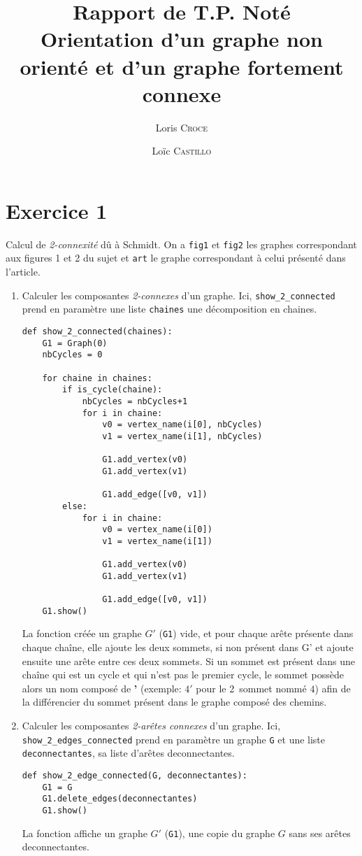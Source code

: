 \documentclass[11pt, a4paper]{article}
\author{Loris \textsc{Croce}\and Loïc \textsc{Castillo}}
\title{
	Rapport de T.P. Noté\\
	Orientation d'un graphe non orienté et d'un graphe fortement connexe
}
\date{}
\begin{document}
\maketitle

\section*{Exercice 1}
Calcul de \emph{2-connexité} dû à Schmidt. On a \verb|fig1| et \verb|fig2| les graphes correspondant aux figures 1 et 2 du sujet et \verb|art| le graphe correspondant à celui présenté dans l'article.
\begin{enumerate}
\item Calculer les composantes \emph{2-connexes} d'un graphe. Ici, \verb|show_2_connected| prend en paramètre une liste \verb|chaines| une décomposition en chaines.

	\begin{verbatim}
def show_2_connected(chaines):
    G1 = Graph(0)
    nbCycles = 0

    for chaine in chaines:
        if is_cycle(chaine):
            nbCycles = nbCycles+1
            for i in chaine:
                v0 = vertex_name(i[0], nbCycles)
                v1 = vertex_name(i[1], nbCycles)

                G1.add_vertex(v0)
                G1.add_vertex(v1)

                G1.add_edge([v0, v1])
        else:
            for i in chaine:
                v0 = vertex_name(i[0])
                v1 = vertex_name(i[1])

                G1.add_vertex(v0)
                G1.add_vertex(v1)

                G1.add_edge([v0, v1])
    G1.show()
    \end{verbatim}

    La fonction créée un graphe $G'$ (\verb|G1|) vide, et pour chaque arête présente dans chaque chaîne, elle ajoute les deux sommets, si non présent dans G' et ajoute ensuite une arête entre ces deux sommets.
    Si un sommet est présent dans une chaîne qui est un cycle et qui n'est pas le premier cycle, le sommet possède alors un nom composé de \textbf{'} (exemple: $4'$ pour le 2\ieme\ sommet nommé $4$) afin de la différencier du sommet présent dans le graphe composé des chemins.

\item Calculer les composantes \emph{2-arêtes connexes} d'un graphe.  Ici, \verb|show_2_edges_connected| prend en paramètre un graphe \verb|G| et une liste \verb|deconnectantes|, sa liste d'arêtes deconnectantes.
	\begin{verbatim}
def show_2_edge_connected(G, deconnectantes):
    G1 = G
    G1.delete_edges(deconnectantes)
    G1.show()
   	\end{verbatim}

   	La fonction affiche un graphe $G'$ (\verb|G1|), une copie du graphe $G$ sans ses arêtes deconnectantes.
\end{enumerate}
\end{document}
